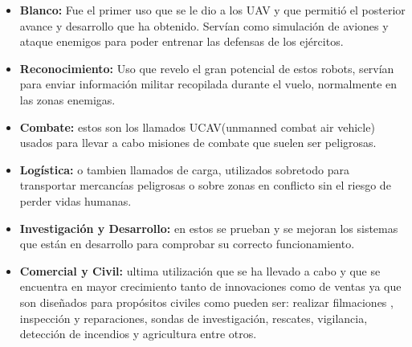 \begin{itemize}
		\item \textbf{Blanco:} Fue el primer uso que se le dio a los UAV y que permitió el posterior avance y desarrollo que ha obtenido. Servían como simulación de aviones y ataque enemigos para poder entrenar las defensas de los ejércitos.
		\item\textbf{Reconocimiento:} Uso que revelo el gran potencial de estos robots, servían para enviar información militar recopilada durante el vuelo, normalmente en las zonas enemigas.
		\item \textbf{Combate:} estos son los llamados UCAV(unmanned combat air vehicle)	usados para llevar a cabo misiones de combate que suelen ser peligrosas.
		\item \textbf{Logística:} o tambien llamados de carga, utilizados sobretodo para transportar mercancías peligrosas o sobre zonas en conflicto sin el riesgo de perder vidas humanas.
		\item \textbf{Investigación y Desarrollo:} en estos se prueban y se mejoran los sistemas que están en desarrollo para comprobar su correcto funcionamiento.
		\item \textbf{Comercial y Civil:} ultima utilización que se ha llevado a cabo y que se encuentra en mayor crecimiento tanto de innovaciones como de ventas ya que son diseñados para propósitos civiles como pueden ser: realizar filmaciones , inspección y reparaciones, sondas de investigación, rescates, vigilancia, detección de incendios y agricultura entre otros.
\end{itemize}

